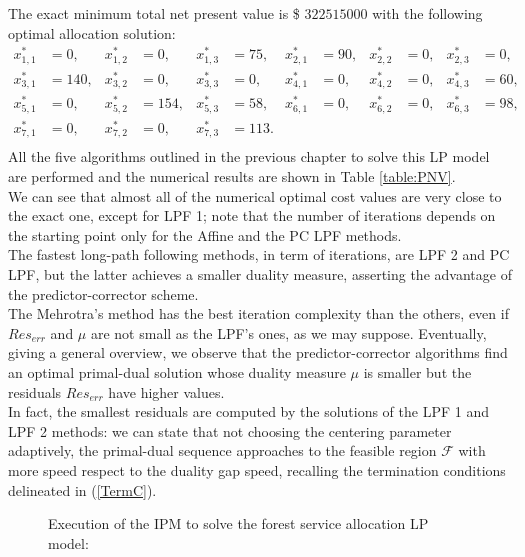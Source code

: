 \documentclass[a4paper,10 pt,titlepage,twoside]{report}
\theoremstyle{plain}
\theoremstyle{definition}
\theoremstyle{remark}
\begin{document}
{{The exact minimum total net present value is \$ $322515000$ with the following optimal allocation solution:
\begin{align*}
x_{1,1}^{*} &=  0, & x_{1,2}^{*}&= 0, & x_{1,3}^{*} &= 75, & x_{2,1}^{*} &= 90, & x_{2,2}^{*} &= 0, & x_{2,3}^{*} &= 0,\\
x_{3,1}^{*} &= 140, & x_{3,2}^{*}&= 0, & x_{3,3}^{*} &= 0, & x_{4,1}^{*} &= 0, & x_{4,2}^{*} &= 0, & x_{4,3}^{*} &= 60,\\
x_{5,1}^{*} &= 0, & x_{5,2}^{*}&= 154, & x_{5,3}^{*} &= 58, & x_{6,1}^{*} &= 0, & x_{6,2}^{*} &= 0, & x_{6,3}^{*} &= 98,\\
 x_{7,1}^{*}&= 0,&x_{7,2}^{*} &= 0, & x_{7,3}^{*} &= 113. & & & &  & & \\
\end{align*}
All the five algorithms outlined in the previous chapter to solve this LP model are performed and the numerical results are shown in Table \ref{table:PNV}.\\ 
We can see that almost all of the numerical optimal cost values are very close to the exact one, except for LPF 1; note that the number of iterations depends on the starting point only for the Affine and the PC LPF methods.\\
The fastest long-path following methods, in term of iterations, are LPF 2 and PC LPF, but the latter achieves a smaller duality measure, asserting the advantage of the predictor-corrector scheme.\\
The Mehrotra's method has the best iteration complexity than the others, even if $Res_{err}$ and $\mu$ are not small as the LPF's ones, as we may suppose. 
Eventually, giving a general overview, we observe that the predictor-corrector algorithms find an optimal primal-dual solution whose duality measure $\mu$ is smaller but the residuals $Res_{err}$ have higher values.\\
In fact, the smallest residuals are computed by the solutions of the LPF 1 and LPF 2 methods: we can state that not choosing the centering parameter adaptively, the primal-dual sequence approaches to the feasible region $\mathcal{F}$ with more speed respect to the duality gap speed, recalling the termination conditions delineated in (\ref{TermC}).\\
\begin{figure}\caption{\label{figure:for}Execution of the IPM to solve the forest service allocation LP model: }

\end{figure}}}
\end{document}
